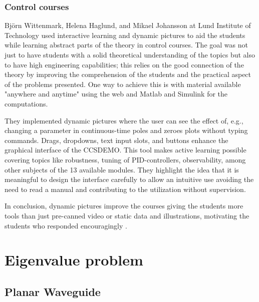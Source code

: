 \subsubsection{Control courses}
Björn Wittenmark, Helena Haglund, and Mikael Johansson at Lund Institute of Technology used interactive learning and dynamic pictures to aid the students while learning abstract parts of the theory in control courses. The goal was not just to have students with a solid theoretical understanding of the topics but also to have high engineering capabilities; this relies on the good connection of the theory by improving the comprehension of the students and the practical aspect of the problems presented. One way to achieve this is with material available "anywhere and anytime" using the web and Matlab and Simulink for the computations. 

They implemented dynamic pictures where the user can see the effect of, e.g., changing a parameter in continuous-time poles and zeroes plots without typing commands. Drags, dropdowns, text input slots, and buttons enhance the graphical interface of the CCSDEMO. This tool makes active learning possible covering topics like robustness, tuning of PID-controllers, observability, among other subjects of the 13 available modules. They highlight the idea that it is meaningful to design the interface carefully to allow an intuitive use avoiding the need to read a manual and contributing to the utilization without supervision.

In conclusion, dynamic pictures improve the courses giving the students more tools than just pre-canned video or static data and illustrations, motivating the students who responded encouragingly \cite{IEEEcontrol}.




\section{Eigenvalue problem}

    \subsection{Planar Waveguide}
        
        
        
